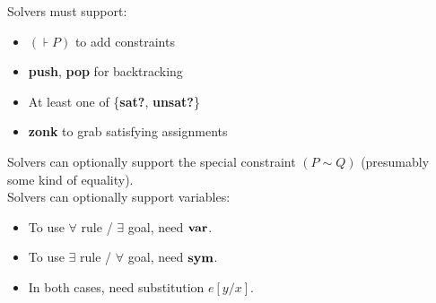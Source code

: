\documentclass[10pt]{article}
\newcommand{\subst}[3]{#1[#2/#3]}
\begin{document}
\noindent Solvers must support: \begin{itemize}
\item $(\assert P)$ to add constraints
\item \textbf{push}, \textbf{pop} for backtracking
\item At least one of \{\textbf{sat?}, \textbf{unsat?}\}
\item \textbf{zonk} to grab satisfying assignments
\end{itemize}

\noindent Solvers can optionally support the special constraint $(P\sim Q)$
  (presumably some kind of equality).\\

\noindent Solvers can optionally support variables: \begin{itemize}
\item To use $\forall$ rule / $\exists$ goal, need $\textbf{var}$.
\item To use $\exists$ rule / $\forall$ goal, need $\textbf{sym}$.
\item In both cases, need substitution $\subst eyx$.
\end{itemize}
\end{document}
